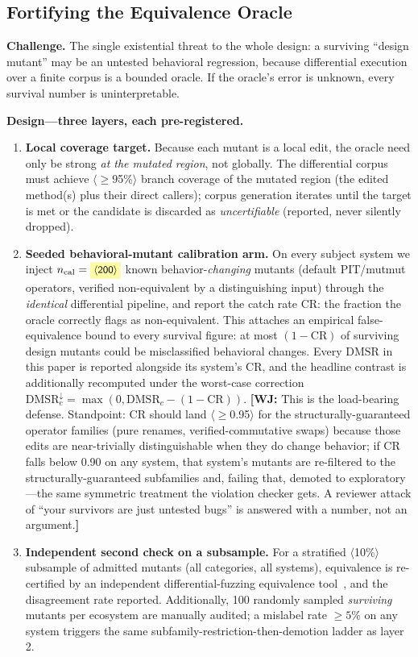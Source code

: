 \documentclass[conference]{IEEEtran}
\newcommand{\ph}[1]{\colorbox{yellow!35}{\small$\langle$\textsf{#1}$\rangle$}}
\newcommand{\wj}[1]{{\color{blue}\footnotesize\textbf{[WJ:} #1\textbf{]}}}
\newcommand{\dmsr}{\mathrm{DMSR}}
\begin{document}
\subsection{Fortifying the Equivalence Oracle}\label{sec:oracle-fort}

\textbf{Challenge.} The single existential threat to the whole design: a surviving ``design mutant'' may be an untested behavioral regression, because differential execution over a finite corpus is a bounded oracle. If the oracle's error is unknown, every survival number is uninterpretable.

\textbf{Design---three layers, each pre-registered.}
\begin{enumerate}[leftmargin=1.4em]
\item \textbf{Local coverage target.} Because each mutant is a local edit, the oracle need only be strong \emph{at the mutated region}, not globally. The differential corpus must achieve \ph{$\geq$95\%} branch coverage of the mutated region (the edited method(s) plus their direct callers); corpus generation iterates until the target is met or the candidate is discarded as \emph{uncertifiable} (reported, never silently dropped).
\item \textbf{Seeded behavioral-mutant calibration arm.} On every subject system we inject $n_{\mathrm{cal}} = \ph{200}$ known behavior-\emph{changing} mutants (default PIT/mutmut operators, verified non-equivalent by a distinguishing input) through the \emph{identical} differential pipeline, and report the catch rate $\mathrm{CR}$: the fraction the oracle correctly flags as non-equivalent. This attaches an empirical false-equivalence bound to every survival figure: at most $(1-\mathrm{CR})$ of surviving design mutants could be misclassified behavioral changes. Every $\dmsr$ in this paper is reported alongside its system's $\mathrm{CR}$, and the headline contrast is additionally recomputed under the worst-case correction $\dmsr_c^{\downarrow} = \max(0, \dmsr_c - (1-\mathrm{CR}))$. \wj{This is the load-bearing defense. Standpoint: CR should land \ph{$\geq$0.95} for the structurally-guaranteed operator families (pure renames, verified-commutative swaps) because those edits are near-trivially distinguishable when they do change behavior; if CR falls below 0.90 on any system, that system's mutants are re-filtered to the structurally-guaranteed subfamilies and, failing that, demoted to exploratory---the same symmetric treatment the violation checker gets. A reviewer attack of ``your survivors are just untested bugs'' is answered with a number, not an argument.}
\item \textbf{Independent second check on a subsample.} For a stratified \ph{10\%} subsample of admitted mutants (all categories, all systems), equivalence is re-certified by an independent differential-fuzzing equivalence tool~\cite{dristi2026}, and the disagreement rate reported. Additionally, 100 randomly sampled \emph{surviving} mutants per ecosystem are manually audited; a mislabel rate $\geq 5\%$ on any system triggers the same subfamily-restriction-then-demotion ladder as layer 2.
\end{enumerate}
\end{document}
